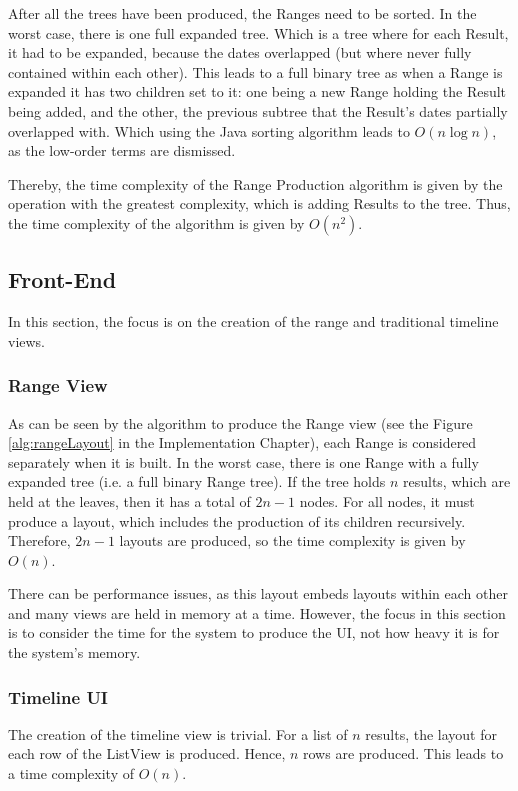 \par After all the trees have been produced, the Ranges need to be sorted. In the worst case, there is one full expanded tree. Which is a tree where for each Result, it had to be expanded, because the dates overlapped (but where never fully contained within each other). This leads to a full binary tree as when a Range is expanded it has two children set to it: one being a new Range holding the Result being added, and the other, the previous subtree that the Result's dates partially overlapped with. Which using the Java sorting algorithm leads to $O(n\log n)$, as the low-order terms are dismissed.

\par Thereby, the time complexity of the Range Production algorithm is given by the operation with the greatest complexity, which is adding Results to the tree. Thus, the time complexity of the algorithm is given by $O(n^2)$.

\subsection{Front-End}
\par In this section, the focus is on the creation of the range and traditional timeline views.
\subsubsection{Range View}
\par As can be seen by the algorithm to produce the Range view (see the Figure \ref{alg:rangeLayout} in the Implementation Chapter), each Range is considered separately when it is built. In the worst case, there is one Range with a fully expanded tree (i.e. a full binary Range tree). If the tree holds $n$ results, which are held at the leaves, then it has a total of $2n-1$ nodes. For all nodes, it must produce a layout, which includes the production of its children recursively. Therefore, $2n-1$ layouts are produced, so the time complexity is given by $O(n)$. 

\par There can be performance issues, as this layout embeds layouts within each other and many views are held in memory at a time. However, the focus in this section is to consider the time for the system to produce the UI, not how heavy it is for the system's memory.

\subsubsection{Timeline UI}
\par The creation of the timeline view is trivial. For a list of $n$ results, the layout for each row of the ListView is produced. Hence, $n$ rows are produced. This leads to a time complexity of $O(n)$.


